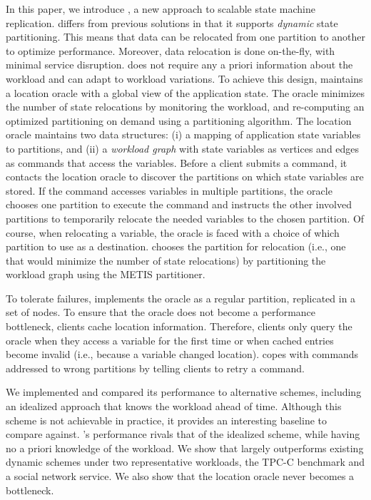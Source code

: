 In this paper, we introduce \dynastar, a new approach to scalable state machine replication.
\dynastar differs from previous solutions in that it supports \emph{dynamic} state partitioning.
This means that data can be relocated from one partition to another to optimize performance.
Moreover, data relocation is done on-the-fly, with minimal service disruption.
\dynastar does not require any a priori information about the workload and can adapt to workload variations.
To achieve this design, \dynastar maintains a
location oracle with a global view of the application state.  The oracle minimizes the
number of state relocations by monitoring the workload, and
re-computing an optimized partitioning on demand using a 
partitioning algorithm.  
The location oracle maintains two data structures: (i) a mapping of application state variables to partitions, and (ii) a \emph{workload graph} with state variables as vertices and edges as commands that access the variables.  
Before a client submits a command, it contacts the
location oracle to discover the partitions on which state variables are
stored.  If the command accesses variables in multiple partitions, the
oracle chooses one partition to execute the command and instructs the other involved partitions to temporarily relocate 
the needed variables to the chosen partition. Of course, when relocating a variable, the oracle
is faced with a choice of which partition to use as a destination.
\dynastar chooses the partition for relocation (i.e., one that
would minimize the number of state relocations) by partitioning the
workload graph using the METIS partitioner.

To tolerate failures, \dynastar implements the oracle as a regular partition, replicated in a set of nodes.
To ensure that the oracle does not become a performance bottleneck, clients cache location information.
Therefore, clients only query the oracle when they access a variable for the first time or when cached entries become invalid (i.e., because a variable changed location).
\dynastar copes with commands addressed to wrong partitions by telling clients to retry a command.

We implemented \dynastar and compared its performance to
alternative schemes, including an idealized approach that knows the workload ahead of time.
Although this scheme is not achievable in practice, it provides an interesting baseline to compare against.
\dynastar's performance rivals that of the idealized scheme, while having no a priori knowledge of the workload.
We show that \dynastar largely outperforms existing dynamic schemes under two representative workloads, the TPC-C benchmark and a social network service.
We also show that the location oracle never becomes a bottleneck.

